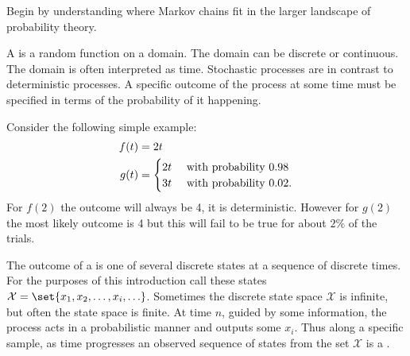 \documentclass[12pt]{article}
\begin{document}
Begin by understanding where Markov chains fit in the larger landscape
of probability theory.

\begin{definition}
    A  is%
    a random function on a domain.  The domain can be discrete or
    continuous.  The domain is often interpreted as time.  Stochastic
    processes are in contrast to deterministic processes.  A specific
    outcome of the process at some time must be specified in terms of
    the probability of it happening.
\end{definition}

\begin{example}
    Consider the following simple example:
    \begin{align*}
        f(t) &= 2t \\
        g(t) &=
        \begin{cases}
            2t & \text{ with probability \( 0.98 \) }\\
            3t & \text{ with probability \( 0.02 \)}.
        \end{cases}
    \end{align*}
    For \( f(2) \) the outcome will always be 4, it is deterministic.
    However for \( g(2) \) the most likely outcome is 4 but this will
    fail to be true for about \( 2\% \) of the trials.
\end{example}

\begin{definition}
    The outcome of a  is one of several discrete states at a sequence of discrete
    times.%
    For the purposes of this introduction call these states \( \mathcal{X}=\set{x_1,x_2,\ldots,x_i,
    \ldots} \).  Sometimes the discrete state space \( \mathcal{X} \)
    is infinite, but often the state space is finite.  At time \( n \),
    guided by some information, the process acts in a probabilistic
    manner and outputs some \( x_i \).  Thus along a specific sample, as
    time progresses an observed sequence of states from the set \(
    \mathcal{X} \) is a .
\end{definition}
\end{document}
